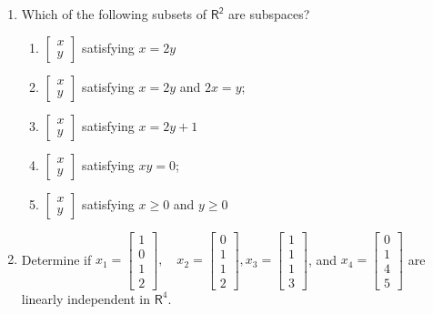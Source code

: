 \documentclass[../main.tex]{subfiles}
\begin{document}
\begin{enumerate}[label=\textbf{3.\arabic*}, noitemsep]

\item Which of the following subsets of $\mathsf{R^{2}}$ are subspaces?

	\begin{enumerate}[label=\textbf{\alph*.}, noitemsep]
	\item $\left[\begin{array}{l}x \\ y\end{array}\right]$ satisfying $x=2 y$
	\item $\left[\begin{array}{l}x \\ y\end{array}\right]$ satisfying $x=2 y$ and $2 x=y$;
	\item $\left[\begin{array}{l}x \\ y\end{array}\right]$ satisfying $x=2 y+1$
	\item $\left[\begin{array}{l}x \\ y\end{array}\right]$ satisfying $x y=0$;
	\item $\left[\begin{array}{l}x \\ y\end{array}\right]$ satisfying $x \geq 0$ and $y \geq 0$
	\end{enumerate}

\item Determine if $x_{1}=\left[\begin{array}{c}1 \\ 0 \\ 1 \\ 2\end{array}\right], \quad x_{2}=\left[\begin{array}{l}0 \\ 1 \\ 1 \\ 2\end{array}\right], x_{3}=\left[\begin{array}{l}1 \\ 1 \\ 1 \\ 3\end{array}\right]$, and $x_{4}=\left[\begin{array}{c}0 \\ 1 \\ 4 \\ 5\end{array}\right]$ are linearly independent in $\mathsf{R}^{4}$.


\end{enumerate}
\end{document}
